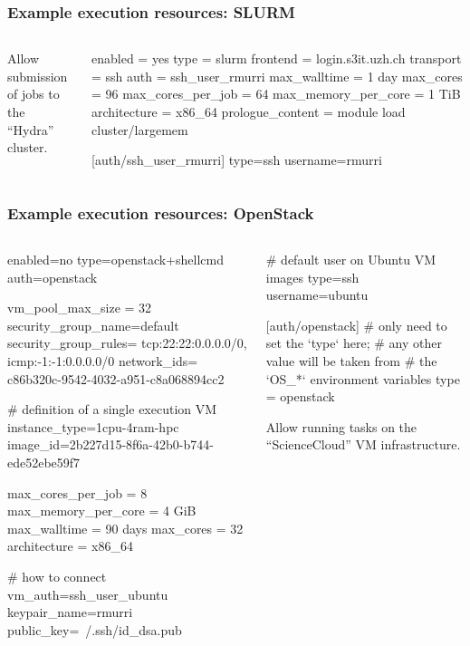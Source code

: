 \documentclass[english,serif,mathserif,usenames,dvipsnames]{beamer}
\begin{document}
\begin{frame}[fragile]
  \frametitle{Example execution resources: SLURM}
  \begin{columns}[t]
    \begin{column}{0.5\textwidth}
      Allow submission of jobs to the ``Hydra'' cluster.
    \end{column}
    \begin{column}{0.5\textwidth}
\begin{stdout}
enabled = yes
type = slurm
frontend = login.s3it.uzh.ch
transport = ssh
auth = ssh_user_rmurri
max_walltime = 1 day
max_cores = 96
max_cores_per_job = 64
max_memory_per_core = 1 TiB
architecture = x86_64
prologue_content =
  module load cluster/largemem

[auth/ssh_user_rmurri]
type=ssh
username=rmurri
\end{stdout}
    \end{column}
  \end{columns}
\end{frame}


\begin{frame}[fragile]
  \frametitle{Example execution resources: OpenStack}
  \begin{columns}[t]
    \begin{column}{0.5\textwidth}
\begin{stdout}
enabled=no
type=openstack+shellcmd
auth=openstack

vm_pool_max_size = 32
security_group_name=default
security_group_rules=
  tcp:22:22:0.0.0.0/0,
  icmp:-1:-1:0.0.0.0/0
network_ids=
  c86b320c-9542-4032-a951-c8a068894cc2

# definition of a single execution VM
instance_type=1cpu-4ram-hpc
image_id=2b227d15-8f6a-42b0-b744-ede52ebe59f7

max_cores_per_job = 8
max_memory_per_core = 4 GiB
max_walltime = 90 days
max_cores = 32
architecture = x86_64

# how to connect
vm_auth=ssh_user_ubuntu
keypair_name=rmurri
public_key=~/.ssh/id_dsa.pub
\end{stdout}
    \end{column}
    \begin{column}{0.5\textwidth}
      \begin{stdout}
# default user on Ubuntu VM images
type=ssh
username=ubuntu


[auth/openstack]
# only need to set the `type` here;
# any other value will be taken from
# the `OS\_*` environment variables
type = openstack
      \end{stdout}

      \+\+\+
      Allow running tasks on the ``ScienceCloud'' VM infrastructure.

    \end{column}
  \end{columns}
\end{frame}
\end{document}
